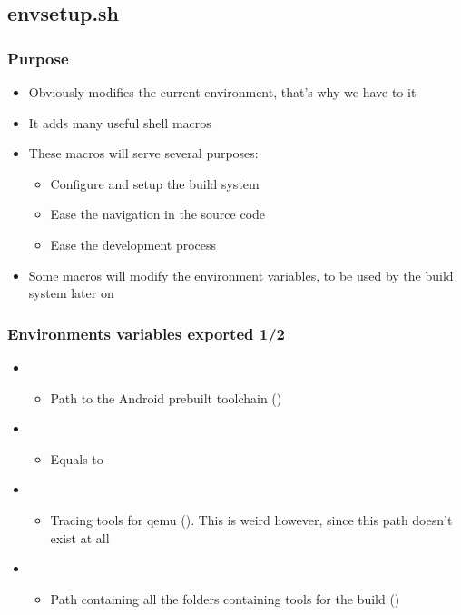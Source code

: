 \subsection{envsetup.sh}

\begin{frame}
  \frametitle{Purpose}
  \begin{itemize}
  \item Obviously modifies the current environment, that's why we have
    to  it
  \item It adds many useful shell macros
  \item These macros will serve several purposes:
    \begin{itemize}
    \item Configure and setup the build system
    \item Ease the navigation in the source code
    \item Ease the development process
    \end{itemize}
  \item Some macros will modify the environment variables, to be used
    by the build system later on
  \end{itemize}
\end{frame}

\begin{frame}
  \frametitle{Environments variables exported 1/2}
  \begin{itemize}
  \item {}
    \begin{itemize}
    \item Path to the Android prebuilt toolchain
      ()
    \end{itemize}
  \item {}
    \begin{itemize}
    \item Equals to 
    \end{itemize}
  \item {}
    \begin{itemize}
    \item Tracing tools for qemu
      (). This is weird however,
      since this path doesn't exist at all
    \end{itemize}
  \item {}
    \begin{itemize}
    \item Path containing all the folders containing tools for the
      build
      ()
    \end{itemize}
  \end{itemize}
\end{frame}


